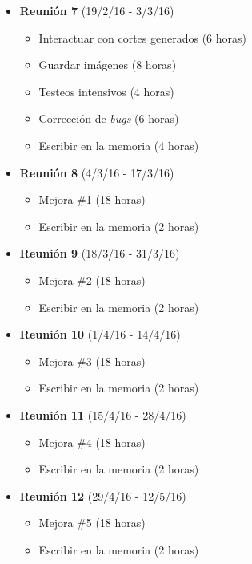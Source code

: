 \begin{itemize}
	\item \textbf{Reunión 7} (19/2/16 - 3/3/16)
	\begin{itemize}
		\item Interactuar con cortes generados (6 horas)
		\item Guardar imágenes (8 horas)
		\item Testeos intensivos (4 horas)
		\item Corrección de \textit{bugs} (6 horas)
		\item Escribir en la memoria (4 horas)
	\end{itemize}
	
	\item \textbf{Reunión 8} (4/3/16 - 17/3/16)
	\begin{itemize}
		\item Mejora \#1 (18 horas)
		\item Escribir en la memoria (2 horas)
	\end{itemize}
	
	\item \textbf{Reunión 9} (18/3/16 - 31/3/16)
	\begin{itemize}
		\item Mejora \#2 (18 horas)
		\item Escribir en la memoria (2 horas)
	\end{itemize}
	
	\item \textbf{Reunión 10} (1/4/16 - 14/4/16)
	\begin{itemize}
		\item Mejora \#3 (18 horas)
		\item Escribir en la memoria (2 horas)
	\end{itemize}
	
	\item \textbf{Reunión 11} (15/4/16 - 28/4/16)
	\begin{itemize}
		\item Mejora \#4 (18 horas)
		\item Escribir en la memoria (2 horas)
	\end{itemize}
	
	\item \textbf{Reunión 12} (29/4/16 - 12/5/16)
	\begin{itemize}
		\item Mejora \#5 (18 horas)
		\item Escribir en la memoria (2 horas)
	\end{itemize}
	

\end{itemize}
